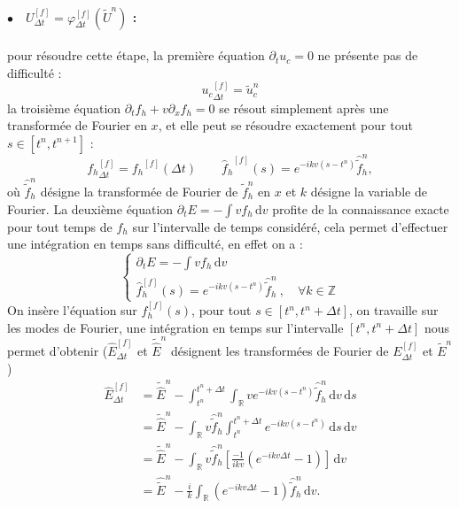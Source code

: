 \paragraph{$\bullet\quad U^{[f]}_{\Delta t} = \varphi^{[f]}_{\Delta t}(\tilde{U}^n)$ :} pour résoudre cette étape, la première équation $\partial_t u_c = 0$ ne présente pas de difficulté :
$$
  {u_c}^{[f]}_{\Delta t} = \tilde{u}_c^n
$$
la troisième équation $\partial_t f_h + v\partial_x f_h = 0$ se résout simplement après une transformée de Fourier en $x$, et elle peut se résoudre exactement pour tout $s\in[t^n,t^{n+1}]$ :
$$
  {f_h}^{[f]}_{\Delta t} = {f_h}^{[f]}(\Delta t) \qquad {\hat{f}_h}^{[f]}(s) = e^{-ikv(s-t^n)}\hat{\tilde{f}}_h^n, 
$$
où $\hat{\tilde{f}}_h^n$ désigne la transformée de Fourier de ${\tilde{f}}_h^n$ en $x$ et $k$ désigne la variable de Fourier. La deuxième équation $\partial_t E = -\int vf_h\,\mathrm{d}v$ profite de la connaissance exacte pour tout temps de $f_h$ sur l'intervalle de temps considéré, cela permet d'effectuer une intégration en temps sans difficulté, en effet on a :
$$
  \begin{cases}
    \partial_t E = -\int vf_h\,\mathrm{d}v \\
    \hat{f}_h^{[f]}(s) = e^{-ikv(s-t^n)}\hat{\tilde{f}}_h^n\ ,\quad\forall k\in\mathbb{Z}
  \end{cases}
$$
On insère l'équation sur $f_h^{[f]}(s)$, pour tout $s\in[t^n,t^n+\Delta t]$, on travaille sur les modes de Fourier, une intégration en temps sur l'intervalle $[t^n,t^n+\Delta t]$ nous permet d'obtenir ($\hat{E}^{[f]}_{\Delta t}$ et  $\tilde{\hat{E}}^n$ désignent les transformées de Fourier de ${E}^{[f]}_{\Delta t}$ et $\tilde{{E}}^n$)
$$
  \begin{aligned}
    \hat{E}^{[f]}_{\Delta t} &= \tilde{\hat{E}}^n - \int_{t^n}^{t^n+\Delta t} \int_\mathbb{R} ve^{-ikv(s-t^n)}\hat{\tilde{f}}_h^n\,\mathrm{d}v\,\mathrm{d}s \\
                             &= \tilde{\hat{E}}^n - \int_\mathbb{R} v\hat{\tilde{f}}_h^n\int_{t^n}^{t^n+\Delta t}e^{-ikv(s-t^n)}\,\mathrm{d}s\,\mathrm{d}v \\
                             &= \tilde{\hat{E}}^n - \int_\mathbb{R} v\hat{\tilde{f}}_h^n\left[\frac{-1}{ikv}\left(e^{-ikv\Delta t}-1\right)\right]\,\mathrm{d}v\\
                             &= \hat{\tilde{E}}^n - \frac{i}{k}\int_\mathbb{R} \left(e^{-ikv\Delta t}-1\right)\hat{\tilde{f}}_h^n\,\mathrm{d}v. 
  \end{aligned}
$$
